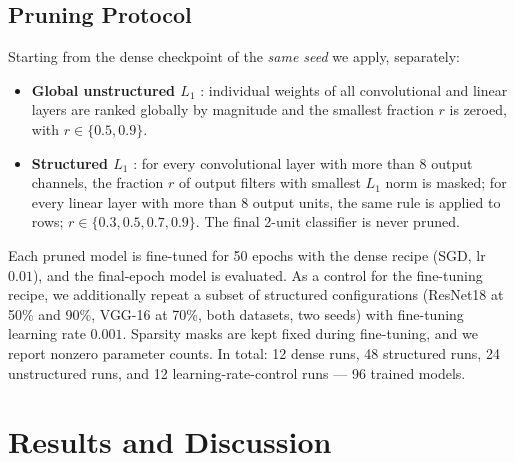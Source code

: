 \documentclass[conference]{IEEEtran}
\begin{document}
\subsection{Pruning Protocol}
Starting from the dense checkpoint of the \emph{same seed} we apply,
separately:
\begin{itemize}
\item \textbf{Global unstructured $L_1$} \cite{han2015learning}:
individual weights of all convolutional and linear layers are ranked
globally by magnitude and the smallest fraction $r$ is zeroed, with
$r \in \{0.5, 0.9\}$.
\item \textbf{Structured $L_1$} \cite{li2017pruning}: for every
convolutional layer with more than 8 output channels, the fraction $r$
of output filters with smallest $L_1$ norm is masked; for every linear
layer with more than 8 output units, the same rule is applied to rows;
$r \in \{0.3, 0.5, 0.7, 0.9\}$. The final 2-unit classifier is never
pruned.
\end{itemize}
Each pruned model is fine-tuned for 50 epochs with the dense recipe
(SGD, lr $0.01$), and the final-epoch model is evaluated. As a control
for the fine-tuning recipe, we additionally repeat a subset of
structured configurations (ResNet18 at 50\% and 90\%, VGG-16 at 70\%,
both datasets, two seeds) with fine-tuning learning rate $0.001$.
Sparsity masks are kept fixed during fine-tuning, and we report nonzero
parameter counts. In total: 12 dense runs, 48 structured runs, 24
unstructured runs, and 12 learning-rate-control runs --- 96 trained
models.

\section{Results and Discussion}
\label{sec:results}
\end{document}
